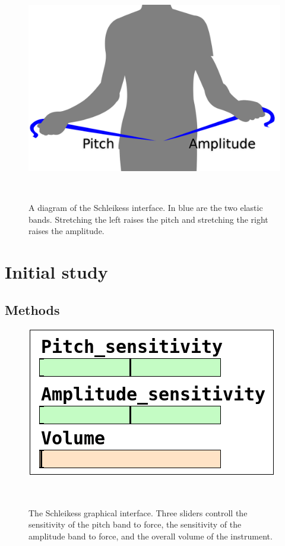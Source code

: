 \documentclass{sigchi}
\begin{document}
\begin{figure}
  \centering
  \includegraphics[width=0.9\columnwidth]{figures/schleikess}
  \caption{A diagram of the Schleikess interface. In blue are the two elastic bands. Stretching the left raises the pitch and stretching the right raises the amplitude.}~\label{fig:schleikess}
\end{figure}

\section{Initial study}

\subsection{Methods}

\begin{figure}
  \centering
  \includegraphics[width=0.9\columnwidth]{figures/pd_interface}
  \caption{The Schleikess graphical interface. Three sliders controll the sensitivity of the pitch band to force, the sensitivity of the amplitude band to force, and the overall volume of the instrument.}~\label{fig:pd-interface}
\end{figure}
\end{document}
